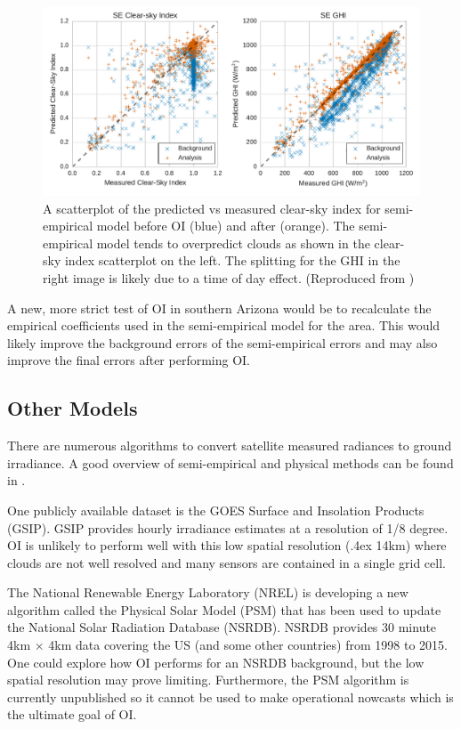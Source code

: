 \begin{figure}[h]
\centering
\includegraphics[width=\textwidth]{figs/suny_scatter.pdf}
\caption[Scatterplot of predicted vs measured clear-sky index for the
semi-empirical model]{A scatterplot of the predicted vs measured
  clear-sky index for semi-empirical model before OI (blue) and after
  (orange). The semi-empirical model tends to overpredict clouds as
  shown in the clear-sky index scatterplot on the left. The splitting
  for the GHI in the right image is likely due to a time of day
  effect.  (Reproduced from \cite{Lorenzo2017})}
\label{fig:suny_scatter}
\end{figure}

A new, more strict test of OI in southern Arizona would be to
recalculate the empirical coefficients used in the semi-empirical
model for the area.
This would likely improve the background errors of the semi-empirical
errors and may also improve the final errors after performing OI.

\subsection{Other Models}
There are numerous algorithms to convert satellite measured radiances
to ground irradiance.
A good overview of semi-empirical and physical methods can be found in
\cite{Perez2013a,Miller2013}.

One publicly available dataset is the GOES Surface and Insolation
Products (GSIP).
GSIP provides hourly irradiance estimates at a resolution of 1/8
degree.
OI is unlikely to perform well with this low spatial resolution
({\raise.4ex \hbox{\texttildelow}}14km) where clouds are not well
resolved and many sensors are contained in a single grid cell.

The National Renewable Energy Laboratory (NREL) is developing a new
algorithm called the Physical Solar Model (PSM) that has been used to update
the National Solar Radiation Database (NSRDB).
NSRDB provides 30 minute 4km $\times$ 4km data covering the US (and
some other countries) from 1998 to 2015.
One could explore how OI performs for an NSRDB background, but the low
spatial resolution may prove limiting.
Furthermore, the PSM algorithm is currently unpublished so it cannot
be used to make operational nowcasts which is the ultimate goal of OI.

